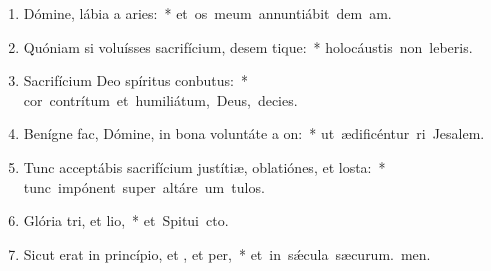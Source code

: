 \begin{flushleft}
\begin{enumerate}[leftmargin=*]
\item Dómine, lábia a aries:~* \mbox{et os meum annuntiábit dem am.}
\item Quóniam si voluísses sacrifícium, desem tique:~* \mbox{holocáustis non leberis.}
\item Sacrifícium Deo spíritus conbutus:~* \mbox{cor contrítum et humiliátum, Deus,  decies.}
\item Benígne fac, Dómine, in bona voluntáte a on:~* \mbox{ut ædificéntur ri Jesalem.}
\item Tunc acceptábis sacrifícium justítiæ, oblatiónes, et losta:~* \mbox{tunc impónent super altáre um tulos.}
\item Glória tri, et lio,~* \mbox{et Spitui cto.}
\item Sicut erat in princípio, et , et per,~* \mbox{et in s\'{\ae}cula sæcurum. men.}

\end{enumerate}
\end{flushleft}

